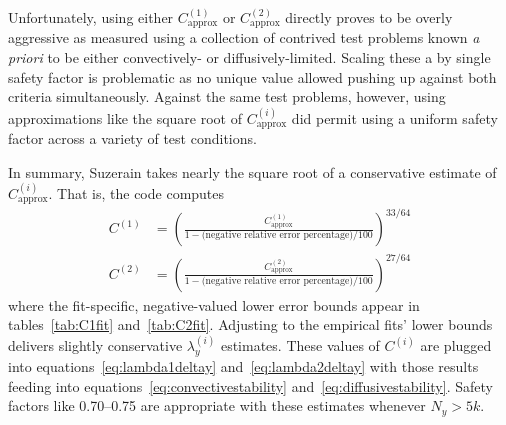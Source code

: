 \documentclass[letterpaper,11pt,nointlimits,reqno,draft]{amsbook}
\begin{document}
Unfortunately, using either $C_\text{approx}^{(1)}$ or $C_\text{approx}^{(2)}$
directly proves to be overly aggressive as measured using a collection of
contrived test problems known \emph{a priori} to be either convectively- or
diffusively-limited.  Scaling these a by single safety factor is problematic as no
unique value allowed pushing up against both criteria simultaneously.  Against
the same test problems, however, using approximations like the square root of
$C_\text{approx}^{(i)}$ did permit using a uniform safety factor across a
variety of test conditions.

In summary, Suzerain takes nearly the square root of a conservative estimate of
$C_\text{approx}^{(i)}$.  That is, the code computes
\begin{align}
  C^{(1)} &= \left(
      \frac{C_\text{approx}^{(1)}}
           {1 - \text{(negative relative error percentage)}/100}
  \right)^{33/64}
\\
  C^{(2)} &= \left(
      \frac{C_\text{approx}^{(2)}}
           {1 - \text{(negative relative error percentage)}/100}
  \right)^{27/64}
\end{align}
where the fit-specific, negative-valued lower error bounds appear in
tables~\ref{tab:C1fit} and~\ref{tab:C2fit}.  Adjusting to the empirical fits'
lower bounds delivers slightly conservative $\lambda_y^{(i)}$ estimates.  These
values of $C^{(i)}$ are plugged into equations~\eqref{eq:lambda1deltay}
and~\eqref{eq:lambda2deltay} with those results feeding into
equations~\eqref{eq:convectivestability} and~\eqref{eq:diffusivestability}.
Safety factors like 0.70--0.75 are appropriate with these estimates whenever
$N_y > 5k$.
\end{document}
